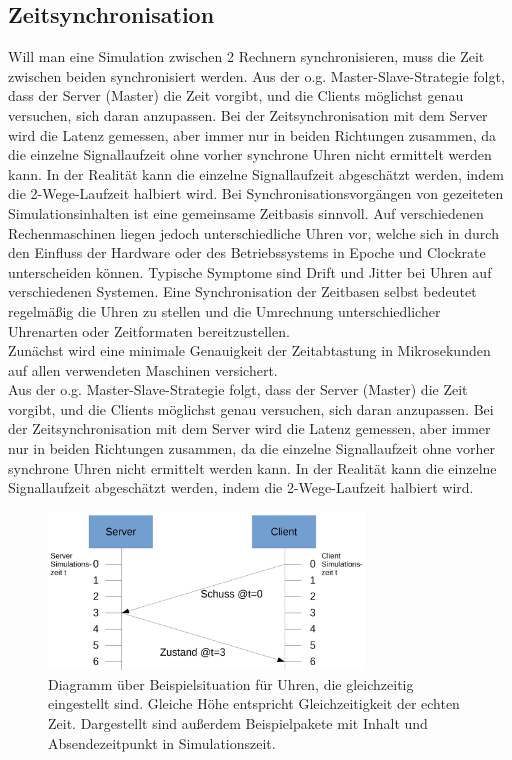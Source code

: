 \subsection{Zeitsynchronisation}

Will man eine Simulation zwischen 2 Rechnern synchronisieren, muss die Zeit zwischen beiden synchronisiert werden. Aus der o.g. Master-Slave-Strategie folgt, dass der Server (Master) die Zeit vorgibt, und die Clients möglichst genau versuchen, sich daran anzupassen. Bei der Zeitsynchronisation mit dem Server wird die Latenz gemessen, aber immer nur in beiden Richtungen zusammen, da die einzelne Signallaufzeit ohne vorher synchrone Uhren nicht ermittelt werden kann. In der Realität kann die einzelne Signallaufzeit abgeschätzt werden, indem die 2-Wege-Laufzeit halbiert wird.
Bei Synchronisationsvorgängen von gezeiteten Simulationsinhalten ist eine gemeinsame Zeitbasis sinnvoll.
Auf verschiedenen Rechenmaschinen liegen jedoch unterschiedliche Uhren vor, welche sich
in durch den Einfluss der Hardware oder des Betriebssystems in Epoche und Clockrate unterscheiden können. Typische Symptome sind Drift und Jitter bei Uhren auf verschiedenen Systemen.
Eine Synchronisation der Zeitbasen selbst bedeutet regelmäßig die Uhren zu stellen und die Umrechnung
unterschiedlicher Uhrenarten oder Zeitformaten bereitzustellen.\\
Zunächst wird eine minimale Genauigkeit der Zeitabtastung in Mikrosekunden auf allen verwendeten Maschinen versichert.\\
Aus der o.g. Master-Slave-Strategie folgt, dass der Server (Master) die Zeit vorgibt, und die Clients möglichst genau versuchen, sich daran anzupassen. Bei der Zeitsynchronisation mit dem Server wird die Latenz gemessen, aber immer nur in beiden Richtungen zusammen, da die einzelne Signallaufzeit ohne vorher synchrone Uhren nicht ermittelt werden kann. In der Realität kann die einzelne Signallaufzeit abgeschätzt werden, indem die 2-Wege-Laufzeit halbiert wird.
\begin{figure}
    \centering
    \includegraphics[width=0.75\textwidth]{./Zeichnung1a.png}
    \caption{Diagramm über Beispielsituation für Uhren, die gleichzeitig eingestellt sind. Gleiche Höhe entspricht Gleichzeitigkeit der echten Zeit. Dargestellt sind außerdem Beispielpakete mit Inhalt und Absendezeitpunkt in Simulationszeit.}
    \label{fig:zeichnung1a}
\end{figure}
